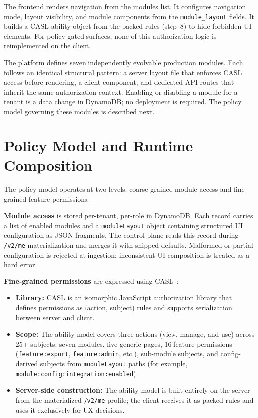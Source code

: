 \documentclass[10pt,journal]{IEEEtran}
\newcommand{\code}[1]{{\small\textcolor{CausifyBlue}{\texttt{#1}}}}
\begin{document}
The frontend renders navigation from the modules list. It configures
navigation mode, layout visibility, and module components from the
\code{module\_layout} fields. It builds a CASL ability object from the packed rules (step~8) to
hide forbidden UI elements. For policy-gated surfaces, none of this authorization logic is reimplemented on the client.

The platform defines seven independently evolvable production modules.
Each follows an identical structural pattern: a server layout file that enforces
CASL access before rendering, a client component, and dedicated API routes
that inherit the same authorization context. Enabling or disabling a module
for a tenant is a data change in DynamoDB; no deployment is required. The
policy model governing these modules is described next.

\section{Policy Model and Runtime Composition}

The policy model operates at two levels: coarse-grained module access and
fine-grained feature permissions.

\textbf{Module access} is stored per-tenant, per-role in DynamoDB. Each
record carries a list of enabled modules and a \code{moduleLayout} object
containing structured UI configuration as JSON fragments. The control plane
reads this record during \code{/v2/me} materialization and merges it with
shipped defaults. Malformed or partial configuration is rejected at
ingestion: inconsistent UI composition is treated as a hard error.

\noindent\textbf{Fine-grained permissions} are expressed using CASL~\cite{casl_docs}:
\begin{itemize}[label=\textbullet, leftmargin=1.2em, topsep=2pt, itemsep=1pt, parsep=0pt, partopsep=0pt]
  \item \textbf{Library:} CASL is an isomorphic JavaScript authorization
    library that defines permissions as (action, subject) rules and supports
    serialization between server and client.
  \item \textbf{Scope:} The ability model covers three actions (view, manage,
    and use) across 25+ subjects: seven modules, five generic pages, 16
    feature permissions (\code{feature:export}, \code{feature:admin}, etc.),
    sub-module subjects, and config-derived subjects from \code{moduleLayout}
    paths (for example, \code{module:config:integration:enabled}).
  \item \textbf{Server-side construction:} The ability model is built entirely
    on the server from the materialized \code{/v2/me} profile; the client
    receives it as packed rules and uses it exclusively for UX decisions.
\end{itemize}
\end{document}
